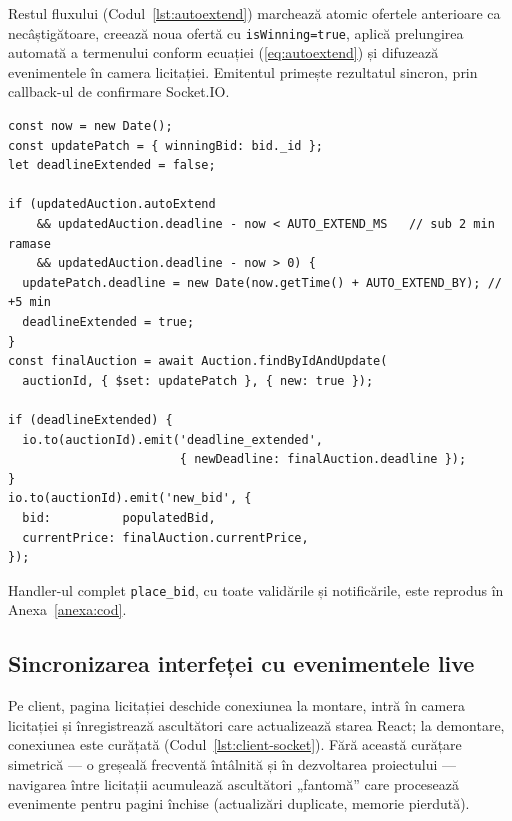 Restul fluxului (Codul~\ref{lst:autoextend}) marchează atomic ofertele anterioare ca necâștigătoare, creează noua ofertă cu \texttt{isWinning=true}, aplică prelungirea automată a termenului conform ecuației (\ref{eq:autoextend}) și difuzează evenimentele în camera licitației. Emitentul primește rezultatul sincron, prin callback-ul de confirmare Socket.IO.

\begin{lstlisting}[caption={Prelungirea automată anti-sniping și difuzarea (fragment)},label={lst:autoextend}]
const now = new Date();
const updatePatch = { winningBid: bid._id };
let deadlineExtended = false;

if (updatedAuction.autoExtend
    && updatedAuction.deadline - now < AUTO_EXTEND_MS   // sub 2 min ramase
    && updatedAuction.deadline - now > 0) {
  updatePatch.deadline = new Date(now.getTime() + AUTO_EXTEND_BY); // +5 min
  deadlineExtended = true;
}
const finalAuction = await Auction.findByIdAndUpdate(
  auctionId, { $set: updatePatch }, { new: true });

if (deadlineExtended) {
  io.to(auctionId).emit('deadline_extended',
                        { newDeadline: finalAuction.deadline });
}
io.to(auctionId).emit('new_bid', {
  bid:          populatedBid,
  currentPrice: finalAuction.currentPrice,
});
\end{lstlisting}

Handler-ul complet \texttt{place\_bid}, cu toate validările și notificările, este reprodus în Anexa~\ref{anexa:cod}.

\subsection{Sincronizarea interfeței cu evenimentele live}

Pe client, pagina licitației deschide conexiunea la montare, intră în camera licitației și înregistrează ascultători care actualizează starea React; la demontare, conexiunea este curățată (Codul~\ref{lst:client-socket}). Fără această curățare simetrică --- o greșeală frecventă întâlnită și în dezvoltarea proiectului --- navigarea între licitații acumulează ascultători „fantomă'' care procesează evenimente pentru pagini închise (actualizări duplicate, memorie pierdută).

